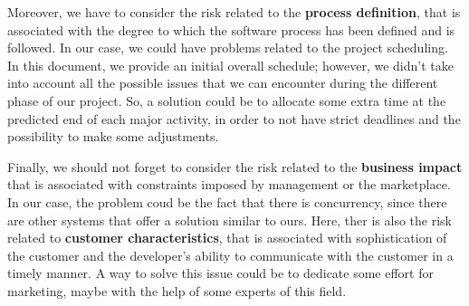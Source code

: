 Moreover, we have to consider the risk related to the \textbf{process definition}, that is associated with the degree to which the software process has been defined and is followed. In our case, we could have problems related to the project scheduling. In this document, we provide an initial overall schedule; however, we didn't take into account all the possible issues that we can encounter during the different phase of our project. So, a solution could be to allocate some extra time at the predicted end of each major activity, in order to not have strict deadlines and the possibility to make some adjustments. 

Finally, we should not forget to consider the risk related to the \textbf{business impact} that is associated with constraints imposed by management or the marketplace. In our case, the problem coud be the fact that there is concurrency, since there are other systems that offer a solution similar to ours. Here, ther is also the risk related to \textbf{customer characteristics}, that is associated with sophistication of the customer and the developer's ability to communicate with the customer in a timely manner. A way to solve this issue could be to dedicate some effort for marketing, maybe with the help of some experts of this field.